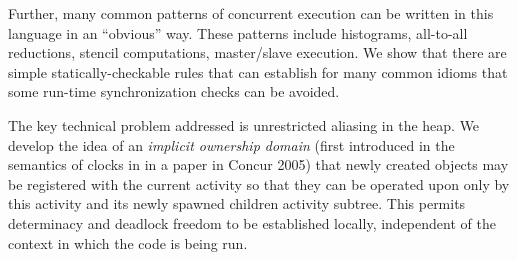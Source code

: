 Further, many common patterns of concurrent execution can be written
in this language in an ``obvious'' way. These patterns include
histograms, all-to-all reductions, stencil computations, master/slave
execution.  We show that there are simple statically-checkable rules
that can establish for many common idioms that some run-time
synchronization checks can be avoided.

The key technical problem addressed is unrestricted aliasing in the
heap.  We develop the idea of an {\em implicit ownership domain}
(first introduced in the semantics of clocks in \Xten{} in a paper in
Concur 2005) that newly created objects may be registered with the
current activity so that they can be operated upon only by this
activity and its newly spawned children activity subtree.  This
permits determinacy and deadlock freedom to be established locally,
independent of the context in which the code is being run.
